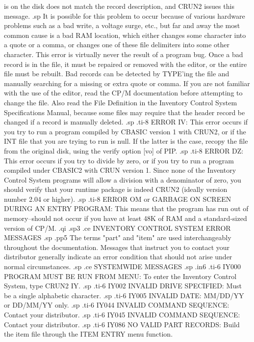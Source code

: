 is on the disk does not match the record description, and CRUN2 issues
this message.
.sp
It is possible for this problem to occur because of various hardware problems
such as a bad write, a voltage surge, etc., but far and away the most
common cause  is a bad RAM location, which either changes some character
into a quote or a comma, or changes one of these file delimiters into
some other character.  This error is virtually never the result of a
program bug.  Once a bad record is in the file, it must be repaired or
removed with the editor, or the entire file must be rebuilt.  Bad records
can be detected by TYPE'ing the file and manually searching for a missing
or extra quote or comma.  If you are not familiar with the use of the
editor, read the CP/M
documentation before attempting to change the file.  Also
read the File Definition in the Inventory Control System Specifications
Manual, because
some files may require that the header record be changed if a record
is manually deleted.
.sp
.ti-8
ERROR IV:  This error occurs if you try to run a program compiled by
CBASIC version 1 with CRUN2, or if the INT file that you are trying to run
is null.  If the latter is the case, recopy the file from the original disk,
using the verify option [vo] of PIP.
.sp
.ti-8
ERROR DZ:  This error occurs if you try to divide by zero, or if you try
to run a program compiled under CBASIC2 with CRUN version 1.  Since none
of the Inventory Control System programs will allow a division with a
denominator of zero, you should verify that your runtime package is indeed
CRUN2 (ideally version number 2.04 or higher).
.sp
.ti-8
ERROR OM or GARBAGE ON SCREEN DURING AN ENTRY PROGRAM:	This means that the
program has run out of memory--should not occur if you have at least 48K
of RAM and a standard-sized version of CP/M.
.qi
.sp3
.ce
INVENTORY CONTROL SYSTEM ERROR MESSAGES
.sp
.pp5
The terms "part" and "item" are used interchangeably throughout
the documentation.  Messages that instruct you to contact your distributor
generally indicate an error condition that should not arise under normal
circumstances.
.sp
.ce
SYSTEMWIDE MESSAGES
.sp
.in6
.ti-6
IY000 PROGRAM MUST BE RUN FROM MENU: To enter the Inventory Control System,
type CRUN2 IY.
.sp
.ti-6
IY002 INVALID DRIVE SPECIFIED:	Must be a single alphabetic character.
.sp
.ti-6
IY005 INVALID DATE:  MM/DD/YY or DD/MM/YY only.
.sp
.ti-6
IY044 INVALID COMMAND SEQUENCE: Contact your distributor.
.sp
.ti-6
IY045 INVALID COMMAND SEQUENCE: Contact your distributor.
.sp
.ti-6
IY086 NO VALID PART RECORDS: Build the item file through the ITEM ENTRY
menu function.
